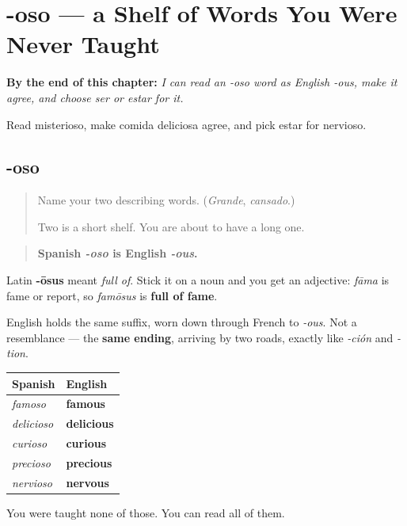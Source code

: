 
\chapter{-oso --- a Shelf of Words You Were Never Taught}
\label{ch:oso}

\begin{chapteropening}
\textbf{By the end of this chapter:} \emph{I can read an -oso word as English -ous, make it agree, and choose ser or estar for it.}

Read misterioso, make comida deliciosa agree, and pick estar for nervioso.
\end{chapteropening}

\section[-oso]{-oso}

\label{lesson:ES-C09-oso}



\begin{quote}
Name your two describing words. (\emph{Grande}, \emph{cansado}.)

Two is a short shelf. You are about to have a long one.
\end{quote}

\begin{grammarlens}[title={Grammar Lens: full of}]
\begin{quote}
\textbf{Spanish \emph{-oso} is English \emph{-ous}.}
\end{quote}

Latin \textbf{-ōsus} meant \emph{full of}. Stick it on a noun and you get an adjective: \emph{fāma} is fame or report, so \emph{famōsus} is \textbf{full of fame}.

English holds the same suffix, worn down through French to \emph{-ous}. Not a resemblance — the \textbf{same ending}, arriving by two roads, exactly like \emph{-ción} and \emph{-tion}.

\noindent
\begin{tabularx}{\linewidth}{@{}>{\raggedright\arraybackslash}X>{\raggedright\arraybackslash}X@{}}
\toprule
\textbf{Spanish} & \textbf{English} \\
\midrule
\emph{famoso} & \textbf{famous} \\
\emph{delicioso} & \textbf{delicious} \\
\emph{curioso} & \textbf{curious} \\
\emph{precioso} & \textbf{precious} \\
\emph{nervioso} & \textbf{nervous} \\
\bottomrule
\end{tabularx}

You were taught none of those. You can read all of them.
\end{grammarlens}

